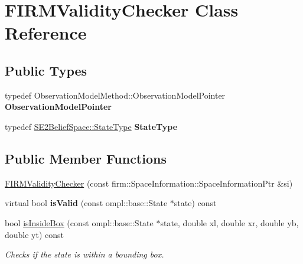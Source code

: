 \hypertarget{class_f_i_r_m_validity_checker}{\section{\-F\-I\-R\-M\-Validity\-Checker \-Class \-Reference}
\label{class_f_i_r_m_validity_checker}
}
\subsection*{\-Public \-Types}
\begin{DoxyCompactItemize}
\item 
\hypertarget{class_f_i_r_m_validity_checker_ac646cd30f5012f2bd3298f3c93189867}{typedef \*
\-Observation\-Model\-Method\-::\-Observation\-Model\-Pointer {\bfseries \-Observation\-Model\-Pointer}}\label{class_f_i_r_m_validity_checker_ac646cd30f5012f2bd3298f3c93189867}

\item 
\hypertarget{class_f_i_r_m_validity_checker_af45d7b29a15e458b4bc5f7d6bf714ba2}{typedef \hyperlink{class_s_e2_belief_space_1_1_state_type}{\-S\-E2\-Belief\-Space\-::\-State\-Type} {\bfseries \-State\-Type}}\label{class_f_i_r_m_validity_checker_af45d7b29a15e458b4bc5f7d6bf714ba2}

\end{DoxyCompactItemize}
\subsection*{\-Public \-Member \-Functions}
\begin{DoxyCompactItemize}
\item 
\hyperlink{class_f_i_r_m_validity_checker_afeac2dfdf78f58c204e09cf57f9abe95}{\-F\-I\-R\-M\-Validity\-Checker} (const firm\-::\-Space\-Information\-::\-Space\-Information\-Ptr \&si)
\item 
\hypertarget{class_f_i_r_m_validity_checker_a29fbd40e9a25430b7f5e296abe654f0b}{virtual bool {\bfseries is\-Valid} (const ompl\-::base\-::\-State $\ast$state) const }\label{class_f_i_r_m_validity_checker_a29fbd40e9a25430b7f5e296abe654f0b}

\item 
\hypertarget{class_f_i_r_m_validity_checker_a3952564ebdabf2a1bf14f5a8e5d8ba11}{bool \hyperlink{class_f_i_r_m_validity_checker_a3952564ebdabf2a1bf14f5a8e5d8ba11}{is\-Inside\-Box} (const ompl\-::base\-::\-State $\ast$state, double xl, double xr, double yb, double yt) const }\label{class_f_i_r_m_validity_checker_a3952564ebdabf2a1bf14f5a8e5d8ba11}

\begin{DoxyCompactList}\small\item\em \-Checks if the state is within a bounding box. \end{DoxyCompactList}\end{DoxyCompactItemize}
